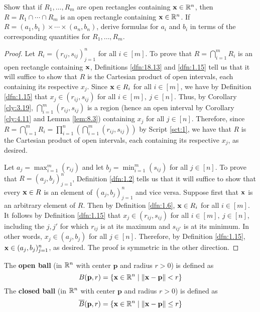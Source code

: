 \documentclass[../main.tex]{subfiles}
\begin{document}
\begin{exercise}\label{exr:18.16}
    Show that if $R_1,\dots,R_m$ are open rectangles containing $\mathbf{x}\in\mathbb{R}^n$, then $R=R_1\cap\cdots\cap R_m$ is an open rectangle containing $\mathbf{x}\in\mathbb{R}^n$. If $R=(a_1,b_1)\times\cdots\times(a_n,b_n)$, derive formulas for $a_i$ and $b_i$ in terms of the corresponding quantities for $R_1,\dots,R_m$.
    \begin{proof}
        Let $R_i=(r_{ij},s_{ij})_{j=1}^n$ for all $i\in[m]$. To prove that $R=\bigcap_{i=1}^mR_i$ is an open rectangle containing $\mathbf{x}$, Definitions \ref{dfn:18.13} and \ref{dfn:1.15} tell us that it will suffice to show that $R$ is the Cartesian product of open intervals, each containing its respective $x_j$. Since $\mathbf{x}\in R_i$ for all $i\in[m]$, we have by Definition \ref{dfn:1.15} that $x_j\in(r_{ij},s_{ij})$ for all $i\in[m],\ j\in[n]$. Thus, by Corollary \ref{cly:3.19}, $\bigcap_{i=1}^m(r_{ij},s_{ij})$ is a region (hence an open interval by Corollary \ref{cly:4.11} and Lemma \ref{lem:8.3}) containing $x_j$ for all $j\in[n]$. Therefore, since $R=\bigcap_{i=1}^mR_i=\prod_{i=1}^n(\bigcap_{i=1}^m(r_{ij},s_{ij}))$ by Script \ref{sct:1}, we have that $R$ is the Cartesian product of open intervals, each containing its respective $x_j$, as desired.\par
        Let $a_j=\max_{i=1}^m(r_{ij})$ and let $b_j=\min_{i=1}^m(s_{ij})$ for all $j\in[n]$. To prove that $R=(a_j,b_j)_{j=1}^n$, Definition \ref{dfn:1.2} tells us that it will suffice to show that every $\mathbf{x}\in R$ is an element of $(a_j,b_j)_{j=1}^n$ and vice versa. Suppose first that $\mathbf{x}$ is an arbitrary element of $R$. Then by Definition \ref{dfn:1.6}, $\mathbf{x}\in R_i$ for all $i\in[m]$. It follows by Definition \ref{dfn:1.15} that $x_j\in(r_{ij},s_{ij})$ for all $i\in[m],\ j\in[n]$, including the $j,j'$ for which $r_{ij}$ is at its maximum and $s_{ij'}$ is at its minimum. In other words, $x_j\in(a_j,b_j)$ for all $j\in[n]$. Therefore, by Definition \ref{dfn:1.15}, $\mathbf{x}\in(a_j,b_j)_{j=1}^n$, as desired. The proof is symmetric in the other direction.
    \end{proof}
\end{exercise}

\begin{definition}\label{dfn:18.17}
    The \textbf{open ball} (in $\mathbb{R}^n$ with center $\mathbf{p}$ and radius $r>0$) is defined as
    \begin{equation*}
        B(\mathbf{p},r) = \{\mathbf{x}\in\mathbb{R}^n\mid\norm{\mathbf{x}-\mathbf{p}}<r\}
    \end{equation*}
    The \textbf{closed ball} (in $\mathbb{R}^n$ with center $\mathbf{p}$ and radius $r>0$) is defined as
    \begin{equation*}
        \overline{B}(\mathbf{p},r) = \{\mathbf{x}\in\mathbb{R}^n\mid\norm{\mathbf{x}-\mathbf{p}}\leq r\}
    \end{equation*}
\end{definition}
\end{document}
